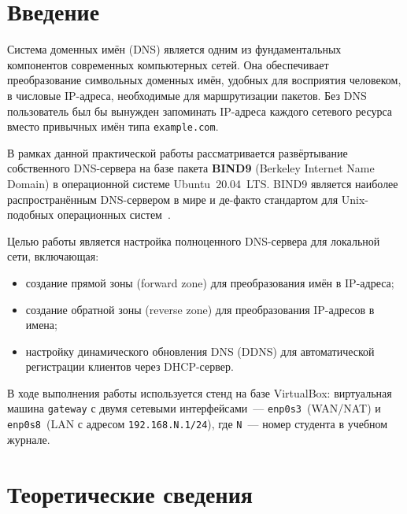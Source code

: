 \documentclass[a4paper,14pt,oneside,openany]{memoir}
\begin{document}
\tableofcontents*

\chapter*{Введение}
\label{ch:intro}

Система доменных имён (DNS) является одним из фундаментальных компонентов современных компьютерных сетей. Она обеспечивает преобразование символьных доменных имён, удобных для восприятия человеком, в числовые IP-адреса, необходимые для маршрутизации пакетов. Без DNS пользователь был бы вынужден запоминать IP-адреса каждого сетевого ресурса вместо привычных имён типа \texttt{example.com}.

В рамках данной практической работы рассматривается развёртывание собственного DNS-сервера на базе пакета \textbf{BIND9} (Berkeley Internet Name Domain) в операционной системе Ubuntu~20.04~LTS. BIND9 является наиболее распространённым DNS-сервером в мире и де-факто стандартом для Unix-подобных операционных систем~\cite{bind9_admin}.

Целью работы является настройка полноценного DNS-сервера для локальной сети, включающая:
\begin{itemize}
    \item создание прямой зоны (forward zone) для преобразования имён в IP-адреса;
    \item создание обратной зоны (reverse zone) для преобразования IP-адресов в имена;
    \item настройку динамического обновления DNS (DDNS) для автоматической регистрации клиентов через DHCP-сервер.
\end{itemize}

В ходе выполнения работы используется стенд на базе VirtualBox: виртуальная машина \texttt{gateway} с двумя сетевыми интерфейсами~--- \texttt{enp0s3}~(WAN/NAT) и \texttt{enp0s8}~(LAN с адресом \texttt{192.168.N.1/24}), где \texttt{N}~--- номер студента в учебном журнале.

\chapter{Теоретические сведения}
\label{ch:theory}
\end{document}
